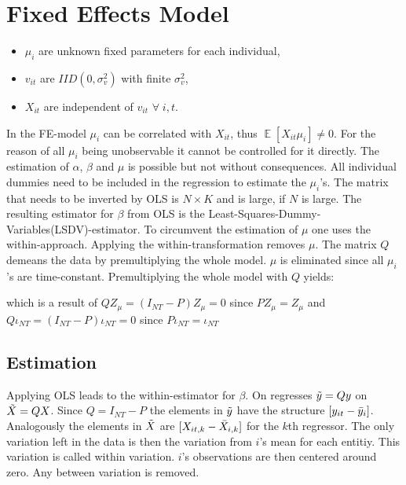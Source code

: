\documentclass[11pt, a4paper, leqno]{article}
\begin{document}

\section{Fixed Effects Model}
\label{sec:Fixed Effects Model}

\begin{itemize}
    \item $\mu_i$ are unknown fixed parameters for each individual,
    \item $v_{it}$ are $IID(0, \sigma_v^2)$ with finite $\sigma_v^2$,
    \item $X_{it}$ are independent of $v_{it}$ $\forall \; i, t$.
\end{itemize}



In the FE-model $\mu_i$ can be correlated with $X_{it}$, thus $\mathop{\mathbb{E}}[X_{it}\mu_i]\neq0$. For the reason of all $\mu_i$ being unobservable it cannot be controlled for it directly. The estimation of $\alpha$, $\beta$ and $\mu$ is possible but not without consequences. All individual dummies need to be included in the regression to estimate the $\mu_i$'s. The matrix that needs to be inverted by OLS is $N\times K$ and is large, if $N$ is large. The resulting estimator for $\beta$ from OLS is the Least-Squares-Dummy-Variables(LSDV)-estimator.
To circumvent the estimation of $\mu$ one uses the within-approach. Applying the within-transformation removes $\mu$. The matrix $Q$ demeans the data by premultiplying the whole model. $\mu$ is eliminated since all $\mu_i$'s are time-constant. 
Premultiplying the whole model with $Q$ yields:



which is a result of $QZ_{\mu}=(I_{NT}-P)Z_{\mu}=0$ since $PZ_{\mu}=Z_{\mu}$
and $Q\iota_{NT}=(I_{NT}-P)\iota_{NT}=0$ since $P\iota_{NT}=\iota_{NT}$

\subsection{Estimation}

Applying OLS leads to the within-estimator for $\beta$. On regresses $\Tilde{y}=Qy$ on $\Tilde{X}=QX$. Since $Q=I_{NT}-P$ the elements in $\Tilde{y}$ have the structure $[y_{it}-\Bar{y}_i]$. Analogously the elements in $\Tilde{X}$ are $[X_{it,k}-\Bar{X}_{i,k}]$ for the $k$th regressor. The only variation left in the data is then the variation from $i$'s mean for each entitiy. This variation is called within variation. $i$'s observations are then centered around zero. Any between variation is removed.
\end{document}
